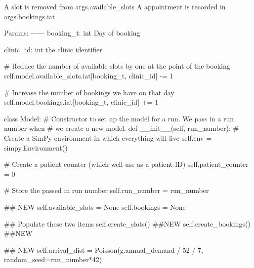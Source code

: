 \documentclass[
  letterpaper,
  DIV=11,
  numbers=noendperiod]{scrreprt}
\newenvironment{Shaded}{}{}
\newcommand{\CommentTok}[1]{\textcolor[rgb]{0.42,0.45,0.49}{#1}}
\newcommand{\DecValTok}[1]{\textcolor[rgb]{0.00,0.36,0.77}{#1}}
\newcommand{\FunctionTok}[1]{\textcolor[rgb]{0.44,0.26,0.76}{#1}}
\newcommand{\KeywordTok}[1]{\textcolor[rgb]{0.84,0.23,0.29}{#1}}
\newcommand{\NormalTok}[1]{\textcolor[rgb]{0.14,0.16,0.18}{#1}}
\newcommand{\OperatorTok}[1]{\textcolor[rgb]{0.14,0.16,0.18}{#1}}
\newcommand{\VariableTok}[1]{\textcolor[rgb]{0.89,0.38,0.04}{#1}}
\newcommand*\circled[1]{\tikz[baseline=(char.base)]{
          \node[shape=circle,draw,inner sep=1pt] (char) {{\scriptsize#1}};}}
\begin{document}
\begin{tcolorbox}
\begin{Shaded}
\begin{Highlighting}[]
\CommentTok{        A slot is removed from args.available\_slots}
\CommentTok{        A appointment is recorded in args.bookings.iat}

\CommentTok{        Params:}
\CommentTok{        {-}{-}{-}{-}{-}{-}}
\CommentTok{        booking\_t: int}
\CommentTok{            Day of booking}

\CommentTok{        clinic\_id: int}
\CommentTok{            the clinic identifier}
\CommentTok{        \textquotesingle{}\textquotesingle{}\textquotesingle{}}

        \CommentTok{\# Reduce the number of available slots by one at the point of the booking}
        \VariableTok{self}\NormalTok{.model.available\_slots.iat[booking\_t, clinic\_id] }\OperatorTok{{-}=} \DecValTok{1}

        \CommentTok{\# Increase the number of bookings we have on that day}
        \VariableTok{self}\NormalTok{.model.bookings.iat[booking\_t, clinic\_id] }\OperatorTok{+=} \DecValTok{1}

\KeywordTok{class}\NormalTok{ Model:}
    \CommentTok{\# Constructor to set up the model for a run.  We pass in a run number when}
    \CommentTok{\# we create a new model.}
    \KeywordTok{def} \FunctionTok{\_\_init\_\_}\NormalTok{(}\VariableTok{self}\NormalTok{, run\_number):}
        \CommentTok{\# Create a SimPy environment in which everything will live}
        \VariableTok{self}\NormalTok{.env }\OperatorTok{=}\NormalTok{ simpy.Environment()}

        \CommentTok{\# Create a patient counter (which we\textquotesingle{}ll use as a patient ID)}
        \VariableTok{self}\NormalTok{.patient\_counter }\OperatorTok{=} \DecValTok{0}

        \CommentTok{\# Store the passed in run number}
        \VariableTok{self}\NormalTok{.run\_number }\OperatorTok{=}\NormalTok{ run\_number}

        \CommentTok{\#\# NEW}
        \VariableTok{self}\NormalTok{.available\_slots }\OperatorTok{=} \VariableTok{None}
        \VariableTok{self}\NormalTok{.bookings }\OperatorTok{=} \VariableTok{None}

        \CommentTok{\#\# Populate these two items}
        \VariableTok{self}\NormalTok{.create\_slots() }\CommentTok{\#\#NEW}
        \VariableTok{self}\NormalTok{.create\_bookings() }\CommentTok{\#\#NEW}


        \CommentTok{\#\# NEW}
        \VariableTok{self}\NormalTok{.arrival\_dist }\OperatorTok{=}\NormalTok{ Poisson(g.annual\_demand }\OperatorTok{/} \DecValTok{52} \OperatorTok{/} \DecValTok{7}\NormalTok{, }\hspace*{\fill}\NormalTok{\circled{1}}
\NormalTok{                                    random\_seed}\OperatorTok{=}\NormalTok{run\_number}\OperatorTok{*}\DecValTok{42}\NormalTok{) }\hspace*{\fill}\NormalTok{\circled{2}}


\end{Highlighting}
\end{Shaded}
\end{tcolorbox}
\end{document}

